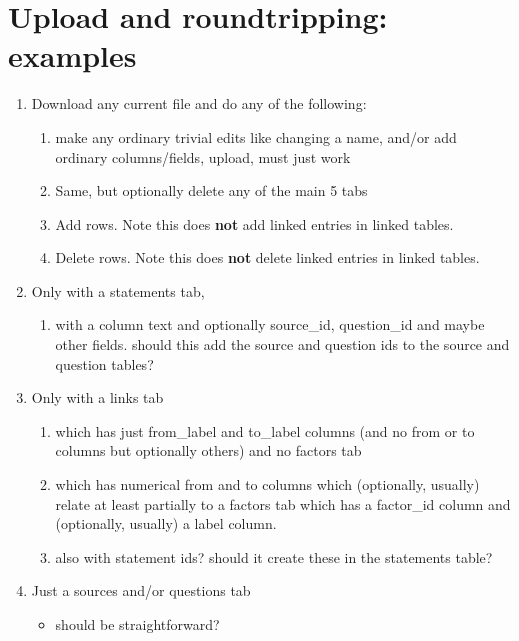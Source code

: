 \documentclass[
]{book}
\providecommand{\tightlist}{%
  \setlength{\itemsep}{0pt}\setlength{\parskip}{0pt}}
\begin{document}
\hypertarget{upload-and-roundtripping-examples}{%
\section{Upload and roundtripping: examples}\label{upload-and-roundtripping-examples}}

\begin{enumerate}
\def\labelenumi{\arabic{enumi}.}
\tightlist
\item
  Download any current file and do any of the following:

  \begin{enumerate}
  \def\labelenumii{\arabic{enumii}.}
  \tightlist
  \item
    make any ordinary trivial edits like changing a name, and/or add ordinary columns/fields, upload, must just work
  \item
    Same, but optionally delete any of the main 5 tabs
  \item
    Add rows. Note this does \textbf{not} add linked entries in linked tables.
  \item
    Delete rows. Note this does \textbf{not} delete linked entries in linked tables.
  \end{enumerate}
\item
  Only with a statements tab,

  \begin{enumerate}
  \def\labelenumii{\arabic{enumii}.}
  \tightlist
  \item
    with a column text and optionally source\_id, question\_id and maybe other fields. should this add the source and question ids to the source and question tables?
  \end{enumerate}
\item
  Only with a links tab

  \begin{enumerate}
  \def\labelenumii{\arabic{enumii}.}
  \tightlist
  \item
    which has just from\_label and to\_label columns (and no from or to columns but optionally others) and no factors tab
  \item
    which has numerical from and to columns which (optionally, usually) relate at least partially to a factors tab which has a factor\_id column and (optionally, usually) a label column.
  \item
    also with statement ids? should it create these in the statements table?
  \end{enumerate}
\item
  Just a sources and/or questions tab

  \begin{itemize}
  \tightlist
  \item
    should be straightforward?
  \end{itemize}
\end{enumerate}
\end{document}
